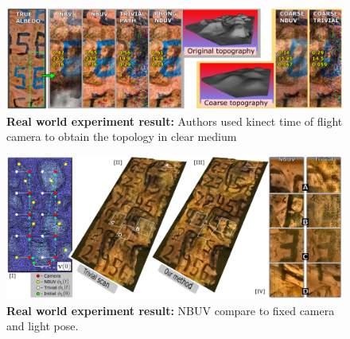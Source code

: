 \documentclass{article}
\begin{document}
\begin{figure}[h!]
\centering
\includegraphics[width=\textwidth]{NBUV_experiment_1.png}
\caption{\textbf{Real world experiment result:} Authors used kinect time of flight camera to obtain the topology in clear medium}
\label{fig:experiment_1}
\end{figure}

\begin{figure}[h!]
\centering
\includegraphics[width=\textwidth]{NBUV_experiment_2.png}
\caption{\textbf{Real world experiment result:} NBUV compare to fixed camera and light pose.}
\label{fig:experiment_2}
\end{figure}



\end{document}
